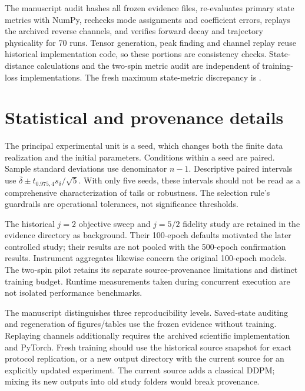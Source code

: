 The manuscript audit hashes all frozen evidence files, re-evaluates primary state metrics with NumPy, rechecks mode assignments and coefficient errors, replays the archived reverse channels, and verifies forward decay and trajectory physicality for 70 runs. Tensor generation, peak finding and channel replay reuse historical implementation code, so these portions are consistency checks. State-distance calculations and the two-spin metric audit are independent of training-loss implementations. The fresh maximum state-metric discrepancy is \AuditMetricDelta.

\section{Statistical and provenance details}
The principal experimental unit is a seed, which changes both the finite data realization and the initial parameters. Conditions within a seed are paired. Sample standard deviations use denominator $n-1$. Descriptive paired intervals use $\bar\delta\pm t_{0.975,4}s_\delta/\sqrt5$. With only five seeds, these intervals should not be read as a comprehensive characterization of tails or robustness. The selection rule's guardrails are operational tolerances, not significance thresholds.

The historical $j=2$ objective sweep and $j=5/2$ fidelity study are retained in the evidence directory as background. Their 100-epoch defaults motivated the later controlled study; their results are not pooled with the 500-epoch confirmation results. Instrument aggregates likewise concern the original 100-epoch models. The two-spin pilot retains its separate source-provenance limitations and distinct training budget. Runtime measurements taken during concurrent execution are not isolated performance benchmarks.

The manuscript distinguishes three reproducibility levels. Saved-state auditing and regeneration of figures/tables use the frozen evidence without training. Replaying channels additionally requires the archived scientific implementation and PyTorch. Fresh training should use the historical source snapshot for exact protocol replication, or a new output directory with the current source for an explicitly updated experiment. The current source adds a classical DDPM; mixing its new outputs into old study folders would break provenance.
